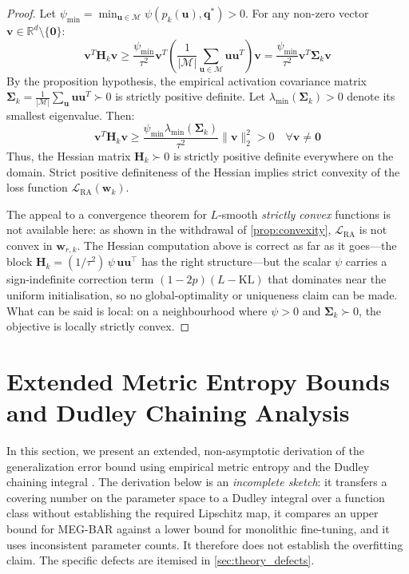 \documentclass{article}
\theoremstyle{definition}
\begin{document}
\begin{proof}
Let $\psi_{\text{min}} = \min_{\mathbf{u} \in \mathcal{M}} \psi(p_k(\mathbf{u}), \mathbf{q}^*) > 0$. For any non-zero vector $\mathbf{v} \in \mathbb{R}^d \setminus \{\mathbf{0}\}$:
\begin{equation}
\mathbf{v}^T \mathbf{H}_k \mathbf{v} \ge \frac{\psi_{\text{min}}}{\tau^2} \mathbf{v}^T \left( \frac{1}{|\mathcal{M}|} \sum_{\mathbf{u} \in \mathcal{M}} \mathbf{u} \mathbf{u}^T \right) \mathbf{v} = \frac{\psi_{\text{min}}}{\tau^2} \mathbf{v}^T \mathbf{\Sigma}_k \mathbf{v}
\end{equation}
By the proposition hypothesis, the empirical activation covariance matrix $\mathbf{\Sigma}_k = \frac{1}{|\mathcal{M}|} \sum_{\mathbf{u}} \mathbf{u} \mathbf{u}^T \succ 0$ is strictly positive definite. Let $\lambda_{\text{min}}(\mathbf{\Sigma}_k) > 0$ denote its smallest eigenvalue. Then:
\begin{equation}
\mathbf{v}^T \mathbf{H}_k \mathbf{v} \ge \frac{\psi_{\text{min}} \lambda_{\text{min}}(\mathbf{\Sigma}_k)}{\tau^2} \|\mathbf{v}\|_2^2 > 0 \quad \forall \mathbf{v} \neq \mathbf{0}
\end{equation}
Thus, the Hessian matrix $\mathbf{H}_k \succ 0$ is strictly positive definite everywhere on the domain. Strict positive definiteness of the Hessian implies strict convexity of the loss function $\mathcal{L}_{\text{RA}}(\mathbf{w}_k)$. 

The appeal to a convergence theorem for $L$-smooth \emph{strictly convex} functions is not available here: as shown in the withdrawal of \cref{prop:convexity}, $\mathcal{L}_{\text{RA}}$ is not convex in $\mathbf{w}_{r,k}$. The Hessian computation above is correct as far as it goes---the block $\mathbf{H}_k = (1/\tau^{2})\,\psi\,\mathbf{u}\mathbf{u}^{\top}$ has the right structure---but the scalar $\psi$ carries a sign-indefinite correction term $(1-2p)(L - \mathrm{KL})$ that dominates near the uniform initialisation, so no global-optimality or uniqueness claim can be made. What can be said is local: on a neighbourhood where $\psi > 0$ and $\mathbf{\Sigma}_k \succ 0$, the objective is locally strictly convex.
\end{proof}

\section{Extended Metric Entropy Bounds and Dudley Chaining Analysis}
\label{sec:proof_metric_entropy}

In this section, we present an extended, non-asymptotic derivation of the generalization error bound using empirical metric entropy and the Dudley chaining integral \citep{dudley1967sizes}. The derivation below is an \emph{incomplete sketch}: it transfers a covering number on the parameter space to a Dudley integral over a function class without establishing the required Lipschitz map, it compares an upper bound for MEG-BAR against a lower bound for monolithic fine-tuning, and it uses inconsistent parameter counts. It therefore does not establish the overfitting claim. The specific defects are itemised in \cref{sec:theory_defects}.
\end{document}
